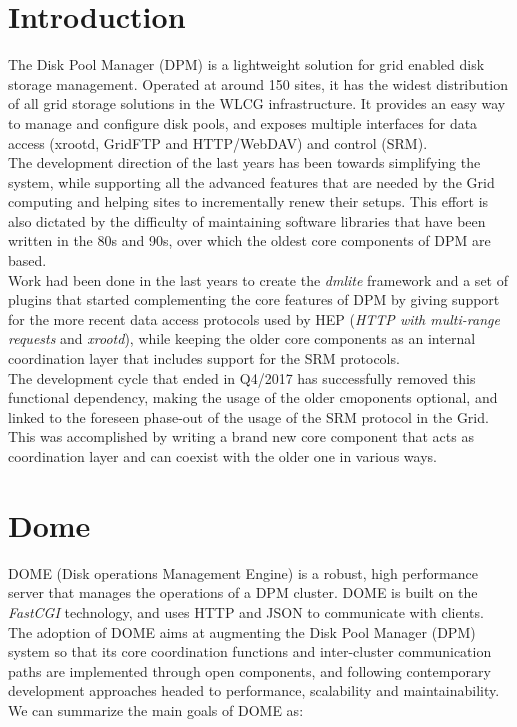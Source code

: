 \documentclass[a4paper]{jpconf}
\begin{document}
\section{Introduction}
The Disk Pool Manager (DPM) is a lightweight solution for grid enabled disk storage
management. Operated at around 150 sites, it has the widest distribution of all grid storage
solutions in the WLCG infrastructure. It provides an easy way to manage and configure disk
pools, and exposes multiple interfaces for data access (xrootd, GridFTP and HTTP/WebDAV)
and control (SRM).\\
The development direction of the last years has been towards simplifying the
system, while supporting all the advanced features that are needed by the Grid computing and
helping sites to incrementally renew their setups.
This effort is also dictated by the difficulty of maintaining software libraries that have been
written in the 80s and 90s, over which the oldest core components of DPM are based.\\
Work had been done in the last years to create the \textit{dmlite} \cite{dpmfuture} \cite{dpmnew} framework and a set of plugins
that started complementing the core features of DPM by giving support for the more recent
data access protocols used by HEP (\textit{HTTP with multi-range requests} and \textit{xrootd}),
while keeping the older core components as an internal coordination layer that includes
support for the SRM protocols.\\
The development cycle that ended in Q4/2017 has successfully removed this functional
dependency, making the usage of the older cmoponents optional, and linked to the
foreseen phase-out of the usage of the SRM protocol in the Grid. This was accomplished by
writing a brand new core component that acts as coordination layer and can coexist with the
older one in various ways.


\section{Dome}

DOME (Disk operations Management Engine) is a robust, high performance server that manages the operations of a DPM cluster. DOME is built on the \textit{FastCGI} \cite{fastcgi} technology,
and uses HTTP and JSON to communicate with clients.
The adoption of DOME aims at augmenting the Disk Pool Manager (DPM) system so that its core coordination functions and inter-cluster communication paths are
implemented through open components, and following contemporary development approaches headed to performance, scalability and maintainability. We can summarize the
main goals of DOME as:
\end{document}
